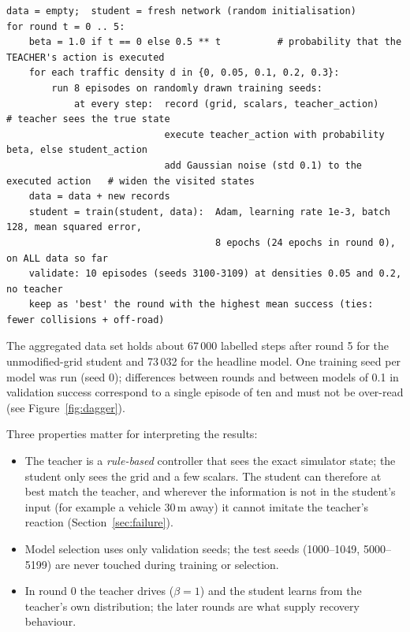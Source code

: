 \begin{lstlisting}[caption={Dataset aggregation as implemented (training seeds 2000--2999, validation seeds 3100--3109).},label={lst:dagger}]
data = empty;  student = fresh network (random initialisation)
for round t = 0 .. 5:
    beta = 1.0 if t == 0 else 0.5 ** t          # probability that the TEACHER's action is executed
    for each traffic density d in {0, 0.05, 0.1, 0.2, 0.3}:
        run 8 episodes on randomly drawn training seeds:
            at every step:  record (grid, scalars, teacher_action)      # teacher sees the true state
                            execute teacher_action with probability beta, else student_action
                            add Gaussian noise (std 0.1) to the executed action   # widen the visited states
    data = data + new records
    student = train(student, data):  Adam, learning rate 1e-3, batch 128, mean squared error,
                                     8 epochs (24 epochs in round 0), on ALL data so far
    validate: 10 episodes (seeds 3100-3109) at densities 0.05 and 0.2, no teacher
    keep as 'best' the round with the highest mean success (ties: fewer collisions + off-road)
\end{lstlisting}
The aggregated data set holds about 67\,000 labelled steps after round 5 for the unmodified-grid student and 73\,032 for the headline model. One training seed per model was run (seed 0); differences between rounds and between models of 0.1 in validation success correspond to a single episode of ten and must not be over-read (see Figure~\ref{fig:dagger}).

Three properties matter for interpreting the results:
\begin{itemize}
\item The teacher is a \emph{rule-based} controller that sees the exact simulator state; the student only sees the grid and a few scalars. The student can therefore at best match the teacher, and wherever the information is not in the student's input (for example a vehicle 30\,m away) it cannot imitate the teacher's reaction (Section~\ref{sec:failure}).
\item Model selection uses only validation seeds; the test seeds (1000--1049, 5000--5199) are never touched during training or selection.
\item In round 0 the teacher drives ($\beta=1$) and the student learns from the teacher's own distribution; the later rounds are what supply recovery behaviour.
\end{itemize}

